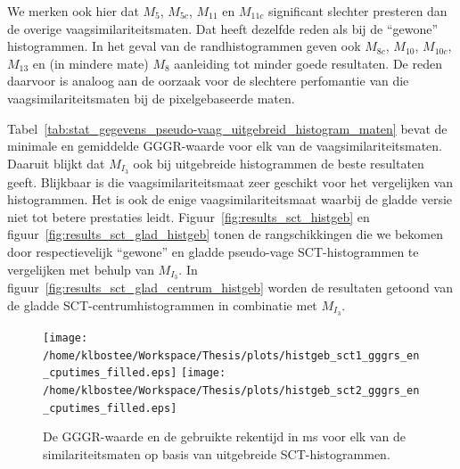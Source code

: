 We merken ook hier dat $M_5$, $M_{5c}$, $M_{11}$ en $M_{11c}$ significant slechter
presteren dan de overige vaagsimilariteitsmaten. Dat heeft dezelfde reden als bij
de ``gewone'' histogrammen. In het geval van de randhistogrammen geven ook $M_{8c}$, $M_{10}$, 
$M_{10c}$, $M_{13}$ en (in mindere mate) $M_{8}$ aanleiding tot minder goede resultaten.
De reden daarvoor is analoog aan de oorzaak voor de slechtere perfomantie van die 
vaagsimilariteitsmaten bij de pixelgebaseerde maten.

Tabel~\ref{tab:stat_gegevens_pseudo-vaag_uitgebreid_histogram_maten} bevat de minimale
en gemiddelde GGGR-waarde voor elk van de vaagsimilariteitsmaten. Daaruit blijkt dat 
$M_{I_3}$ ook bij uitgebreide histogrammen de beste resultaten geeft. Blijkbaar
is die vaagsimilariteitsmaat zeer geschikt voor het vergelijken van histogrammen. Het
is ook de enige vaagsimilariteitsmaat waarbij de gladde versie niet tot betere 
prestaties leidt. Figuur~\ref{fig:results_sct_histgeb} en 
figuur~\ref{fig:results_sct_glad_histgeb} tonen de rangschikkingen die we bekomen
door respectievelijk ``gewone'' en gladde pseudo-vage SCT-histogrammen te vergelijken
met behulp van $M_{I_3}$. In figuur~\ref{fig:results_sct_glad_centrum_histgeb} worden 
de resultaten getoond van de gladde SCT-centrumhistogrammen in combinatie met $M_{I_3}$.

\begin{figure}[bp]
\centering
\texttt{[image: /home/klbostee/Workspace/Thesis/plots/histgeb\_sct1\_gggrs\_en\_cputimes\_filled.eps]} 
\texttt{[image: /home/klbostee/Workspace/Thesis/plots/histgeb\_sct2\_gggrs\_en\_cputimes\_filled.eps]}
\vspace{1pt}
\caption{\label{fig:histgeb_sct_gggrs_en_cputimes}De GGGR-waarde en de gebruikte rekentijd in ms voor elk 
van de similariteitsmaten op basis van uitgebreide SCT-histogrammen.}
\end{figure}

